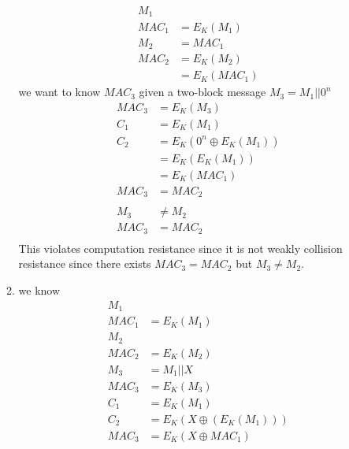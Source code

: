 \documentclass{assignment}
\begin{document}
\begin{problemlist}
\begin{problem}
\begin{answer}
\begin{enumerate}[label=(\alph*)]
\begin{enumerate}
            	  \begin{align*}
                  	M_1 \\
            	  	MAC_1 &= E_K(M_1) \\
                    M_2 &= MAC_1 \\
                    MAC_2 &= E_K(M_2) \\ 
                    	  &= E_K(MAC_1) 
            	  \end{align*}
                  we want to know $MAC_3$ given a two-block message $M_3 = M_1||0^n$
                  \begin{align*}
                  	MAC_3 &= E_K(M_3) \\ 
                      C_1 &= E_K(M_1) \\
                      C_2 &= E_K(0^n \oplus E_K(M_1)) \\
                      	  &= E_K(E_K(M_1))\\
                          &= E_K(MAC_1) \\
                    MAC_3 &= MAC_2 \\ \\
					 M_3 &\neq M_2 \\ 
                     MAC_3 &= MAC_2 \\
                  \end{align*}
                  This violates computation resistance since it is not weakly collision resistance since there exists $MAC_3 = MAC_2$ but $M_3 \neq M_2$. \\
            \item we know
            	  \begin{align*}
            	  	M_1 \\
            	  	MAC_1 &= E_K(M_1) \\
                    M_2 \\
                    MAC_2 &= E_K(M_2) \\
                    M_3 &= M_1||X \\
                    MAC_3 &= E_K(M_3) \\
                      C_1 &= E_K(M_1) \\
                      C_2 &= E_K(X \oplus (E_K(M_1))) \\
                    MAC_3 &= E_K(X \oplus MAC_1) 
            	  \end{align*}

\end{enumerate}
\end{enumerate}
\end{answer}
\end{problem}
\end{problemlist}
\end{document}
